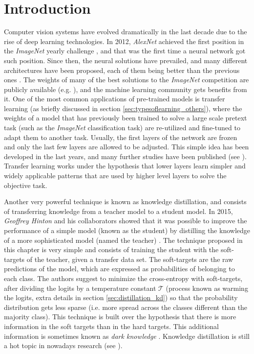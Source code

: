 \section{Introduction}
Computer vision systems have evolved dramatically in the last decade due to the rise of deep learning technologies. In 2012, \textit{AlexNet} \autocite{krizhevsky2012} achieved the first position in the \textit{ImageNet} yearly challenge \autocite{ILSVRC15}, and that was the first time a neural network got such position. Since then, the neural solutions have prevailed, and many different architectures have been proposed, each of them being better than the previous ones \autocite{khan2020, algan2021}. The weights of many of the best solutions to the \textit{ImageNet} competition are publicly available (e.g. \autocite{he2016, chollet2017, szegedy2016, szegedy2017, howard2017, pham2018, tan2019}), and the machine learning community gets benefits from it. One of the most common applications of pre-trained models is transfer learning \autocite{huang2021} (as briefly discussed in section \ref{sec:typesoflearning_others}), where the weights of a model that has previously been trained to solve a large scale pretext task (such as the \textit{ImageNet} classification task) are re-utilized and fine-tuned to adapt them to another task. Usually, the first layers of the network are frozen and only the last few layers are allowed to be adjusted. This simple idea has been developed in the last years, and many further studies have been published (see \autocite{zhu2018, wu2021, pzhao2021}). Transfer learning works under the hypothesis that lower layers learn simpler and widely applicable patterns that are used by higher level layers to solve the objective task.

Another very powerful technique is known as knowledge distillation, and consists of transferring knowledge from a teacher model to a student model. In 2015, \textit{Geoffrey Hinton} and his collaborators showed that it was possible to improve the performance of a simple model (known as the student) by distilling the knowledge of a more sophisticated model (named the teacher) \autocite{hinton2015}. The technique proposed in this chapter is very simple and consists of training the student with the soft-targets of the teacher, given a transfer data set. The soft-targets are the raw predictions of the model, which are expressed as probabilities of belonging to each class. The authors suggest to minimize the cross-entropy with soft-targets, after dividing the logits by a temperature constant $\mathcal{T}$ (process known as warming the logits, extra details in section \ref{sec:distillation_kd}) so that the probability distribution gets less sparse (i.e. more spread across the classes different than the majority class). This technique is built over the hypothesis that there is more information in the soft targets than in the hard targets. This additional information is sometimes known as \textit{dark knowledge} \autocite{gou2020}. Knowledge distillation is still a hot topic in nowadays research (see \autocite{tan2021, zhao2021, lee2021}).


